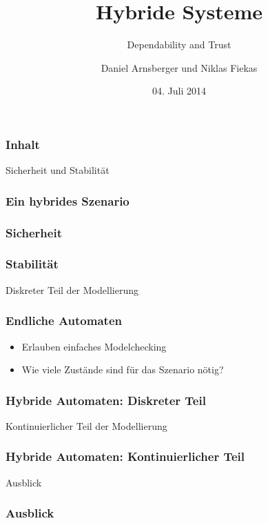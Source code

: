 \documentclass[ngerman]{beamer}
\title{Hybride Systeme}
\subtitle{Dependability and Trust}
\author{Daniel Arnsberger und Niklas Fiekas}
\institute{Institut für Informatik}
\date{04. Juli 2014}
\begin{document}
\begin{frame}
    \titlepage
\end{frame}

\begin{frame}
    \frametitle{Inhalt}
    \tableofcontents
\end{frame}

\begin{section}{Sicherheit und Stabilität}

\begin{frame}
    \frametitle{Ein hybrides Szenario}
\end{frame}

\begin{frame}
    \frametitle{Sicherheit}
\end{frame}

\begin{frame}
    \frametitle{Stabilität}
\end{frame}

\end{section}
\begin{section}{Diskreter Teil der Modellierung}

\begin{frame}
    \frametitle{Endliche Automaten}

    \begin{itemize}
        \item Erlauben einfaches Modelchecking
        \item Wie viele Zustände sind für das Szenario nötig?
    \end{itemize}
\end{frame}

\begin{frame}
    \frametitle{Hybride Automaten: Diskreter Teil}
\end{frame}

\end{section}
\begin{section}{Kontinuierlicher Teil der Modellierung}

\begin{frame}
    \frametitle{Hybride Automaten: Kontinuierlicher Teil}
\end{frame}

\end{section}
\begin{section}{Ausblick}

\begin{frame}
    \frametitle{Ausblick}
\end{frame}

\end{section}
\end{document}
